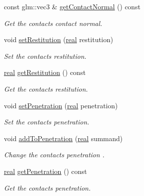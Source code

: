\begin{DoxyCompactItemize}
const glm\+::vec3 \& \mbox{\hyperlink{classr3_1_1_particle_contact_a35b1266f0ebc69fe67dbceaf4ad4c2a0}{get\+Contact\+Normal}} () const
\begin{DoxyCompactList}\small\item\em Get the contact\textquotesingle{}s contact normal. \end{DoxyCompactList}\item 
void \mbox{\hyperlink{classr3_1_1_particle_contact_ad4e76907d589db86ef3e3ff767c3bb6e}{set\+Restitution}} (\mbox{\hyperlink{namespacer3_ab2016b3e3f743fb735afce242f0dc1eb}{real}} restitution)
\begin{DoxyCompactList}\small\item\em Set the contact\textquotesingle{}s restitution. \end{DoxyCompactList}\item 
\mbox{\hyperlink{namespacer3_ab2016b3e3f743fb735afce242f0dc1eb}{real}} \mbox{\hyperlink{classr3_1_1_particle_contact_a89c8382938e10cff1846085f16e8b4a2}{get\+Restitution}} () const
\begin{DoxyCompactList}\small\item\em Get the contact\textquotesingle{}s restitution. \end{DoxyCompactList}\item 
void \mbox{\hyperlink{classr3_1_1_particle_contact_ade0d7d9fddc11108eacd522cb03b2ffd}{set\+Penetration}} (\mbox{\hyperlink{namespacer3_ab2016b3e3f743fb735afce242f0dc1eb}{real}} penetration)
\begin{DoxyCompactList}\small\item\em Set the contact\textquotesingle{}s penetration. \end{DoxyCompactList}\item 
void \mbox{\hyperlink{classr3_1_1_particle_contact_a0e798bd1d6c587ee1275ae0d70a4a728}{add\+To\+Penetration}} (\mbox{\hyperlink{namespacer3_ab2016b3e3f743fb735afce242f0dc1eb}{real}} summand)
\begin{DoxyCompactList}\small\item\em Change the contact\textquotesingle{}s penetration . \end{DoxyCompactList}\item 
\mbox{\hyperlink{namespacer3_ab2016b3e3f743fb735afce242f0dc1eb}{real}} \mbox{\hyperlink{classr3_1_1_particle_contact_a9bff741e1a56b01dc43013cab0b9ae08}{get\+Penetration}} () const
\begin{DoxyCompactList}\small\item\em Get the contact\textquotesingle{}s penetration. \end{DoxyCompactList}\item 

\end{DoxyCompactItemize}
